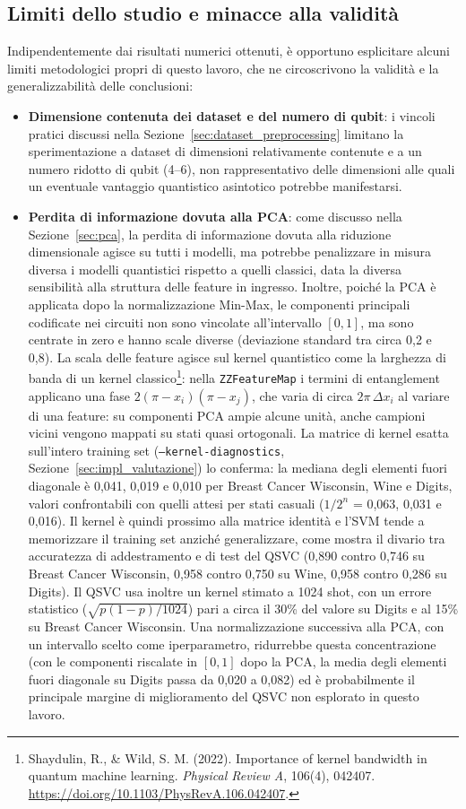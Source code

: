\subsection{Limiti dello studio e minacce alla validità}
\label{sec:limiti_studio}
Indipendentemente dai risultati numerici ottenuti, è opportuno esplicitare alcuni limiti metodologici propri di questo lavoro, che ne circoscrivono la validità e la generalizzabilità delle conclusioni:
\begin{itemize}
    \item \textbf{Dimensione contenuta dei dataset e del numero di qubit}: i vincoli pratici discussi nella Sezione~\ref{sec:dataset_preprocessing} limitano la sperimentazione a dataset di dimensioni relativamente contenute e a un numero ridotto di qubit (4--6), non rappresentativo delle dimensioni alle quali un eventuale vantaggio quantistico asintotico potrebbe manifestarsi.
    \item \textbf{Perdita di informazione dovuta alla PCA}: come discusso nella Sezione~\ref{sec:pca}, la perdita di informazione dovuta alla riduzione dimensionale agisce su tutti i modelli, ma potrebbe penalizzare in misura diversa i modelli quantistici rispetto a quelli classici, data la diversa sensibilità alla struttura delle feature in ingresso. Inoltre, poiché la PCA è applicata dopo la normalizzazione Min-Max, le componenti principali codificate nei circuiti non sono vincolate all'intervallo $[0, 1]$, ma sono centrate in zero e hanno scale diverse (deviazione standard tra circa 0,2 e 0,8). La scala delle feature agisce sul kernel quantistico come la larghezza di banda di un kernel classico\footnote{Shaydulin, R., \& Wild, S. M. (2022). Importance of kernel bandwidth in quantum machine learning. \textit{Physical Review A}, 106(4), 042407. \url{https://doi.org/10.1103/PhysRevA.106.042407}.}: nella \texttt{ZZFeatureMap} i termini di entanglement applicano una fase $2(\pi - x_i)(\pi - x_j)$, che varia di circa $2\pi\,\Delta x_i$ al variare di una feature: su componenti PCA ampie alcune unità, anche campioni vicini vengono mappati su stati quasi ortogonali. La matrice di kernel esatta sull'intero training set (\texttt{--kernel-diagnostics}, Sezione~\ref{sec:impl_valutazione}) lo conferma: la mediana degli elementi fuori diagonale è 0,041, 0,019 e 0,010 per Breast Cancer Wisconsin, Wine e Digits, valori confrontabili con quelli attesi per stati casuali ($1/2^n$ = 0,063, 0,031 e 0,016). Il kernel è quindi prossimo alla matrice identità e l'SVM tende a memorizzare il training set anziché generalizzare, come mostra il divario tra accuratezza di addestramento e di test del QSVC (0,890 contro 0,746 su Breast Cancer Wisconsin, 0,958 contro 0,750 su Wine, 0,958 contro 0,286 su Digits). Il QSVC usa inoltre un kernel stimato a 1024 shot, con un errore statistico ($\sqrt{p(1-p)/1024}$) pari a circa il 30\% del valore su Digits e al 15\% su Breast Cancer Wisconsin. Una normalizzazione successiva alla PCA, con un intervallo scelto come iperparametro, ridurrebbe questa concentrazione (con le componenti riscalate in $[0, 1]$ dopo la PCA, la media degli elementi fuori diagonale su Digits passa da 0,020 a 0,082) ed è probabilmente il principale margine di miglioramento del QSVC non esplorato in questo lavoro.

\end{itemize}
